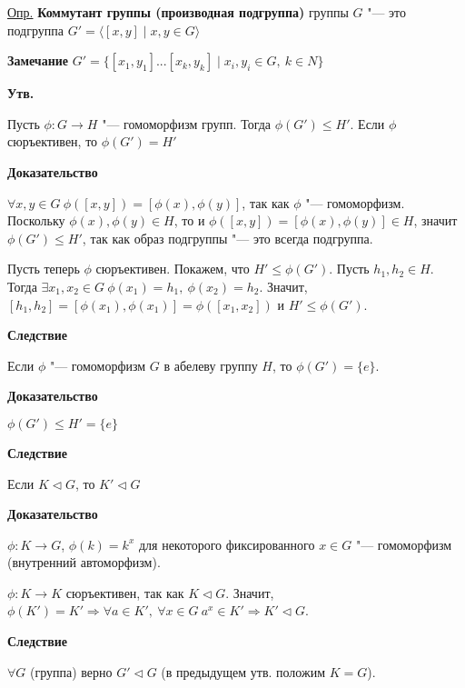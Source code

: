 \documentclass{article}
\begin{document}
\vspace{10pt} 

\underline{Опр.} \textbf{Коммутант группы (производная подгруппа)} группы $G$ "--- это подгруппа $G' = \langle [x, y] \mid x, y \in G \rangle$

\vspace{5pt} 

\textbf{Замечание}
$G' = \{[x_1, y_1]...[x_k, y_k] \mid x_i, y_i \in G, \ k \in N\}$

\vspace{5pt} 

\textbf{Утв.}

Пусть $\phi: G \rightarrow H$ "--- гомоморфизм групп. Тогда $\phi(G') \leq H'$. Если $\phi$ сюръективен, то $\phi(G') = H'$

\textbf{Доказательство}

$\forall x, y \in G \  \phi([x, y]) = [\phi(x), \phi(y)]$, так как $\phi$ "--- гомоморфизм. Поскольку $\phi(x), \phi(y) \in H$, то и $\phi([x, y]) = [\phi(x), \phi(y)] \in H$, значит $\phi(G') \leq H'$, так как образ подгруппы "--- это всегда подгруппа.

Пусть теперь $\phi$ сюръективен. Покажем, что $H' \leq \phi(G')$. Пусть $h_1, h_2 \in H$. Тогда $\exists x_1, x_2 \in G \  \phi(x_1) = h_1, \  \phi(x_2) = h_2$. Значит, $[h_1, h_2] = [\phi(x_1), \phi(x_1)] = \phi([x_1, x_2])$ и $H' \leq \phi(G')$.

\vspace{10pt}

\textbf{Следствие}

Если $\phi$ "--- гомоморфизм $G$ в абелеву группу $H$, то $\phi(G') = \{e\}$.

\textbf{Доказательство}

$\phi(G') \leq H' = \{e\}$

\vspace{5pt}

\textbf{Следствие}

Если $K \triangleleft G$, то $K' \triangleleft G$

\textbf{Доказательство}

$\phi: K \rightarrow G$, $\phi(k) = k^x$ для некоторого фиксированного $x \in G$ "--- гомоморфизм (внутренний автоморфизм).

$\phi: K \rightarrow K$ сюръективен, так как $K \triangleleft G$. Значит, $\phi(K') = K' \Rightarrow \forall a \in K', \  \forall x \in G \  a^x \in K' \Rightarrow K' \triangleleft G$.

\vspace{5pt}

\textbf{Следствие}

$\forall G$ (группа) верно $G' \triangleleft G$ (в предыдущем утв. положим $K = G$).
\end{document}
